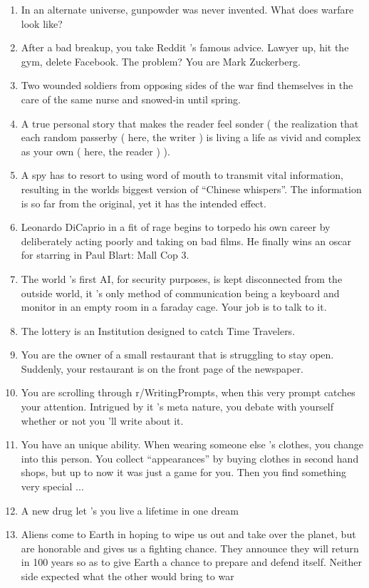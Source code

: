 \begin{enumerate}[noitemsep]
    \item In an alternate universe, gunpowder was never invented. What does warfare look like?
    \item After a bad breakup, you take Reddit 's famous advice. Lawyer up, hit the gym, delete Facebook. The problem? You are Mark Zuckerberg.
    \item Two wounded soldiers from opposing sides of the war find themselves in the care of the same nurse and snowed-in until spring.
    \item A true personal story that makes the reader feel sonder ( the realization that each random passerby ( here, the writer ) is living a life as vivid and complex as your own ( here, the reader ) ).
    \item A spy has to resort to using word of mouth to transmit vital information, resulting in the worlds biggest version of “Chinese whispers”. The information is so far from the original, yet it has the intended effect.
    \item Leonardo DiCaprio in a fit of rage begins to torpedo his own career by deliberately acting poorly and taking on bad films. He finally wins an oscar for starring in Paul Blart: Mall Cop 3.
    \item The world 's first AI, for security purposes, is kept disconnected from the outside world, it 's only method of communication being a keyboard and monitor in an empty room in a faraday cage. Your job is to talk to it.
    \item The lottery is an Institution designed to catch Time Travelers.
    \item You are the owner of a small restaurant that is struggling to stay open. Suddenly, your restaurant is on the front page of the newspaper.
    \item You are scrolling through r/WritingPrompts, when this very prompt catches your attention. Intrigued by it 's meta nature, you debate with yourself whether or not you 'll write about it.
    \item You have an unique ability. When wearing someone else 's clothes, you change into this person. You collect “appearances” by buying clothes in second hand shops, but up to now it was just a game for you. Then you find something very special ...
    \item A new drug let 's you live a lifetime in one dream
    \item Aliens come to Earth in hoping to wipe us out and take over the planet, but are honorable and gives us a fighting chance. They announce they will return in 100 years so as to give Earth a chance to prepare and defend itself. Neither side expected what the other would bring to war

\end{enumerate}
